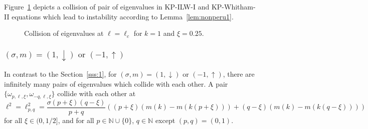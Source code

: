 \documentclass[12pt]{amsart}    %
\renewcommand{\geq}{\geqslant}
\newcommand{\N}{\mathbb{N}}
\newcommand{\oned}{(1,\downarrow)}
\newcommand{\minu}{(-1,\uparrow)}
\numberwithin{equation}{section}
\begin{document}
Figure~\ref{fig:lem4.3} depicts a collision of pair of eigenvalues in KP-ILW-I and KP-Whitham-II equations which lead to instability according to Lemma~\ref{lem:nonperu1}.

\begin{figure}%
    \centering
    \qquad
    \caption{Collision of eigenvalues at $\ell=\ell_c$ for $k=1$ and $\xi=0.25$.}%
    \label{fig:lem4.3}%
\end{figure}

\subsubsection{$\boxed{(\sigma,m)=\oned \text{ or } \minu}$}\label{sss:2}
In contrast to the Section~\ref{sss:1}, for $(\sigma,m)=\oned $ or $\minu$, there are infinitely many pairs of eigenvalues which collide with each other. A pair $\{\omega_{p,\ell,\xi},\omega_{-q,\ell,\xi}\}$ collide with each other at
\[
\ell^2 = \ell^2_{p,q} = \dfrac{\sigma (p+\xi)(q-\xi)}{p+q}((p+\xi)(m(k)-m(k(p+\xi)))+(q-\xi)(m(k)-m(k(q-\xi))))
\] 
for all $\xi\in (0,1/2]$, and for all $p\in \N\cup \{0\}$, $q\in \N$ except $(p,q)=(0,1)$.
\end{document}
